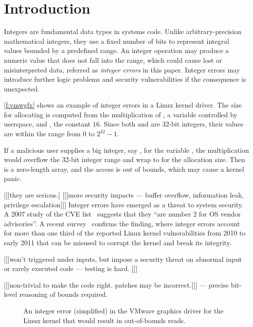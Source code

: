 \section{Introduction}
\label{s:intro}

Integers are fundamental data types in systems code.  Unlike
arbitrary-precision mathematical integers, they use a fixed number
of bits to represent integral values bounded by a predefined range.
An integer operation may produce a numeric value that does not fall
into the range, which could cause lost or misinterpreted data, referred
as \emph{integer errors} in this paper.  Integer errors may introduce
further logic problems and security vulnerabilities if the consequence
is unexpected.

\autoref{f:vmwgfx} shows an example of integer errors in a Linux
kernel driver.  The size for allocating  is computed from
the multiplication of , a variable controlled
by userspace, and , the constant
$16$.  Since both  and  are 32-bit
integers, their values are within the range from 0 to $2^{32} - 1$.

If a malicious user supplies a big integer, say ,
for the variable , the multiplication would
overflow the 32-bit integer range and wrap to  for the allocation size.  Then  is a zero-length
array, and the access  is out of bounds, which may
cause a kernel panic.

[[[they are serious.]
[[[more security impacts --- buffer overflow, information leak,
privilege escalation]]]
Integer errors have emerged as a threat to system security.  A 2007
study of the CVE list~\cite{christey:vuln} suggests that they ``are
number 2 for OS vendor advisories''.  A recent survey~\cite{chen:kbugs}
confirms the finding, where integer errors account for more than
one third of the reported Linux kernel vulnerabilities from 2010
to early 2011 that can be misused to corrupt the kernel and break
its integrity.

[[[won't triggered under inputs, but impose a security threat
on abnormal input or rarely executed code --- testing is hard.
]]]

[[[non-trivial to make the code right. patches may be incorrect.]]]
--- precise bit-level reasoning of bounds required.

\begin{figure}

\caption{An integer error (simplified) in the VMware graphics driver
for the Linux kernel that would result in out-of-bounds reads.}
\label{f:vmwgfx}
\end{figure}
